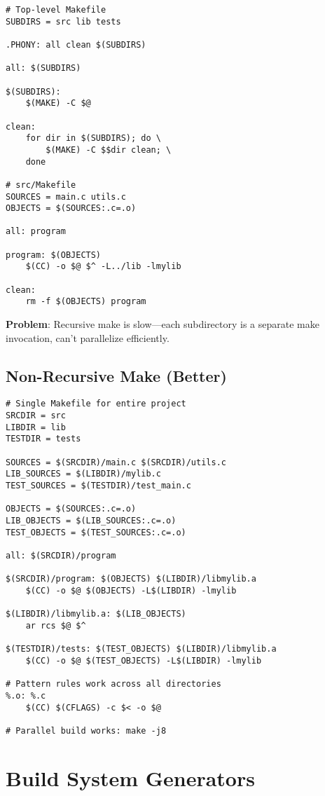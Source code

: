 \begin{lstlisting}
# Top-level Makefile
SUBDIRS = src lib tests

.PHONY: all clean $(SUBDIRS)

all: $(SUBDIRS)

$(SUBDIRS):
	$(MAKE) -C $@

clean:
	for dir in $(SUBDIRS); do \
		$(MAKE) -C $$dir clean; \
	done

# src/Makefile
SOURCES = main.c utils.c
OBJECTS = $(SOURCES:.c=.o)

all: program

program: $(OBJECTS)
	$(CC) -o $@ $^ -L../lib -lmylib

clean:
	rm -f $(OBJECTS) program
\end{lstlisting}

\textbf{Problem}: Recursive make is slow---each subdirectory is a separate make invocation, can't parallelize efficiently.

\subsection{Non-Recursive Make (Better)}

\begin{lstlisting}
# Single Makefile for entire project
SRCDIR = src
LIBDIR = lib
TESTDIR = tests

SOURCES = $(SRCDIR)/main.c $(SRCDIR)/utils.c
LIB_SOURCES = $(LIBDIR)/mylib.c
TEST_SOURCES = $(TESTDIR)/test_main.c

OBJECTS = $(SOURCES:.c=.o)
LIB_OBJECTS = $(LIB_SOURCES:.c=.o)
TEST_OBJECTS = $(TEST_SOURCES:.c=.o)

all: $(SRCDIR)/program

$(SRCDIR)/program: $(OBJECTS) $(LIBDIR)/libmylib.a
	$(CC) -o $@ $(OBJECTS) -L$(LIBDIR) -lmylib

$(LIBDIR)/libmylib.a: $(LIB_OBJECTS)
	ar rcs $@ $^

$(TESTDIR)/tests: $(TEST_OBJECTS) $(LIBDIR)/libmylib.a
	$(CC) -o $@ $(TEST_OBJECTS) -L$(LIBDIR) -lmylib

# Pattern rules work across all directories
%.o: %.c
	$(CC) $(CFLAGS) -c $< -o $@

# Parallel build works: make -j8
\end{lstlisting}

\section{Build System Generators}

